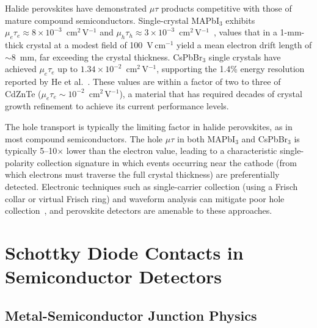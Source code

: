 Halide perovskites have demonstrated $\mu\tau$ products competitive with
those of mature compound semiconductors.  Single-crystal MAPbI$_3$
exhibits $\mu_e\tau_e \approx 8 \times 10^{-3}$~cm$^2$\,V$^{-1}$ and
$\mu_h\tau_h \approx 3 \times 10^{-3}$~cm$^2$\,V$^{-1}$~\cite{Saidaminov2015},
values that in a 1-mm-thick crystal at a modest field of 100~V\,cm$^{-1}$
yield a mean electron drift length of $\sim$8~mm, far exceeding the
crystal thickness.  CsPbBr$_3$ single crystals have achieved
$\mu_e\tau_e$ up to $1.34 \times 10^{-2}$~cm$^2$\,V$^{-1}$, supporting
the 1.4\% energy resolution reported by He et al.~\cite{He_NatPhoton_2021}.
These values are within a factor of two to three of CdZnTe
($\mu_e\tau_e \sim 10^{-2}$~cm$^2$\,V$^{-1}$), a material that has
required decades of crystal growth refinement to achieve its current
performance levels.

The hole transport is typically the limiting factor in halide perovskites,
as in most compound semiconductors.  The hole $\mu\tau$ in both MAPbI$_3$
and CsPbBr$_3$ is typically 5--10$\times$ lower than the electron value,
leading to a characteristic single-polarity collection signature in which
events occurring near the cathode (from which electrons must traverse the
full crystal thickness) are preferentially detected.  Electronic techniques
such as single-carrier collection (using a Frisch collar or virtual Frisch
ring) and waveform analysis can mitigate poor hole collection~\cite{Luke1995},
and perovskite detectors are amenable to these approaches.

\section{Schottky Diode Contacts in Semiconductor Detectors}
\label{sec:schottky}

\subsection{Metal-Semiconductor Junction Physics}

